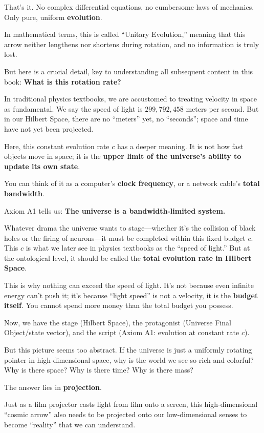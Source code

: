 \documentclass[11pt,a4paper,twoside]{book}
\begin{document}
That's it. No complex differential equations, no cumbersome laws of mechanics. Only pure, uniform \textbf{evolution}.

In mathematical terms, this is called ``Unitary Evolution,'' meaning that this arrow neither lengthens nor shortens during rotation, and no information is truly lost.

But here is a crucial detail, key to understanding all subsequent content in this book: \textbf{What is this rotation rate?}

In traditional physics textbooks, we are accustomed to treating velocity in space as fundamental. We say the speed of light is $299,792,458$ meters per second. But in our Hilbert Space, there are no ``meters'' yet, no ``seconds''; space and time have not yet been projected.

Here, this constant evolution rate $c$ has a deeper meaning. It is not how fast objects move in space; it is the \textbf{upper limit of the universe's ability to update its own state}.

You can think of it as a computer's \textbf{clock frequency}, or a network cable's \textbf{total bandwidth}.

Axiom A1 tells us: \textbf{The universe is a bandwidth-limited system.}

Whatever drama the universe wants to stage---whether it's the collision of black holes or the firing of neurons---it must be completed within this fixed budget $c$. This $c$ is what we later see in physics textbooks as the ``speed of light.'' But at the ontological level, it should be called the \textbf{total evolution rate in Hilbert Space}.

This is why nothing can exceed the speed of light. It's not because even infinite energy can't push it; it's because ``light speed'' is not a velocity, it is the \textbf{budget itself}. You cannot spend more money than the total budget you possess.

Now, we have the stage (Hilbert Space), the protagonist (Universe Final Object/state vector), and the script (Axiom A1: evolution at constant rate $c$).

But this picture seems too abstract. If the universe is just a uniformly rotating pointer in high-dimensional space, why is the world we see so rich and colorful? Why is there space? Why is there time? Why is there mass?

The answer lies in \textbf{projection}.

Just as a film projector casts light from film onto a screen, this high-dimensional ``cosmic arrow'' also needs to be projected onto our low-dimensional senses to become ``reality'' that we can understand.
\end{document}
